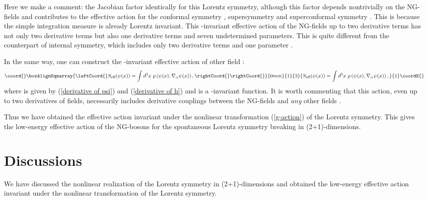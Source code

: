 \documentclass[a4paper,12pt]{article}
\begin{document}
Here we make a comment: the Jacobian factor \coordHE{} identically
for this Lorentz symmetry, although this factor depends 
nontrivially on the NG-fields and 
contributes to the effective action for the 
conformal symmetry \cite{Salam-Strathdee2}, supersymmetry
\cite{Volkov-Akulov} and superconformal symmetry \cite{Uematsu}.  
This is because the
simple integration measure \coordHE{} is already Lorentz invariant.
This \coordHE{}-invariant effective action of the NG-fields up to two
derivative terms has not only two derivative terms but 
also one derivative terms and seven undetermined parameters. 
This is quite different from 
the counterpart of internal symmetry, which includes only two
derivative terms and one parameter \cite{Weinberg}. 

In the same way, one can construct the \coordHE{}-invariant effective action
of other field \coordHE{}: 
\begin{eqnarray}\coord{}\boxAlignEqnarray{\leftCoord{}
S_{\textrm{eff}}(\psi(x)) = \int d^3 x~p \left(\psi(x),
\nabla_{\alpha} \psi(x) \right), \rightCoord{}\label{effective action of psi}
\rightCoord{}}{0mm}{1}{3}{
S_{\textrm{eff}}(\psi(x)) = \int d^3 x~p \left(\psi(x),
\nabla_{\alpha} \psi(x) \right), }{1}\coordE{}\end{eqnarray}    
where \coordHE{} is given by (\ref{derivative of psi}) 
and (\ref{derivative of h}) and \coordHE{} is a \coordHE{}-invariant function.
It is worth commenting that this action, even up to two derivatives of
fields, necessarily includes derivative couplings 
between the NG-fields \coordHE{} and \textit{any} other fields \coordHE{}. 

Thus we have obtained the effective action invariant under the
nonlinear transformation (\ref{g-action}) of the Lorentz symmetry.
This gives the low-energy effective action of the NG-bosons for the 
spontaneous Lorentz symmetry breaking in (2+1)-dimensions.

\section{Discussions}
We have discussed the nonlinear realization of the Lorentz symmetry in 
(2+1)-dimensions and obtained the low-energy effective action 
invariant under the nonlinear transformation of the Lorentz symmetry.    
\end{document}
